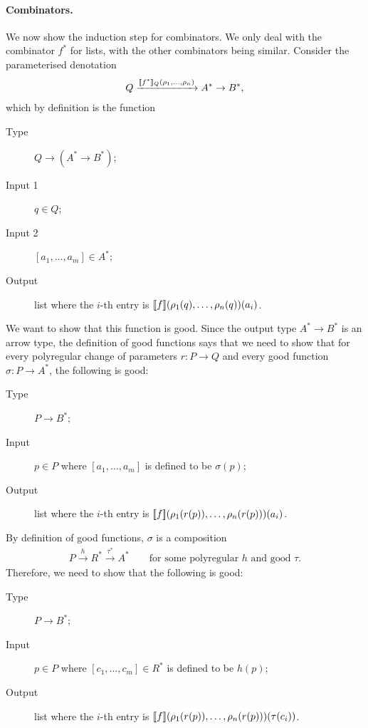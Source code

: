 \paragraph*{Combinators.} We now show the induction step for combinators. 
We only deal with the combinator $f^*$ for lists, with the other combinators being similar. Consider the parameterised denotation 
\begin{align*}
Q \xrightarrow{[\![f^*]\!]_{Q} (\rho_1,\ldots,\rho_n)}{A^* \to B^*},
\end{align*}
which by definition is the function 
\begin{description}
    \item [Type] $Q \to (A^* \to B^*)$;
    \item [Input 1] $q \in Q$;
    \item [Input 2] $[a_1,\ldots,a_m] \in A^*$;
    \item [Output] list where the $i$-th entry is $[\![f]\!] (\rho_1(q),\ldots,\rho_n(q))(a_i)$.
\end{description}
We want to show that this function is good. Since the output type $A^* \to B^*$ is an arrow type, the definition of good functions says that we need to show that for  every polyregular change of parameters $r : P \to Q$ and every good function $\sigma : P \to A^*$, the following is  good:
\begin{description}
    \item [Type] $P \to B^*$;
    \item [Input] $p \in P$ where   $[a_1,\ldots,a_m]$ is defined to be $\sigma(p)$;
    \item [Output] list where the $i$-th entry is $[\![f]\!] (\rho_1(r(p)),\ldots,\rho_n(r(p)))(a_i)$.
\end{description}
By definition of good functions,  $\sigma$ is a composition
\begin{align*}
P \xrightarrow h R^* \xrightarrow {\tau^*} A^* \qquad \text{for some polyregular $h$ and good $\tau$}.
\end{align*}
Therefore, we need to show that the following  is good:
\begin{description}
    \item [Type] $P \to B^*$;
    \item [Input] $p \in P$ where   $[c_1,\ldots,c_m] \in R^*$ is defined to be $h(p)$;
    \item [Output] list where the $i$-th entry is $[\![f]\!] (\rho_1(r(p)),\ldots,\rho_n(r(p)))(\tau(c_i))$.
\end{description}
